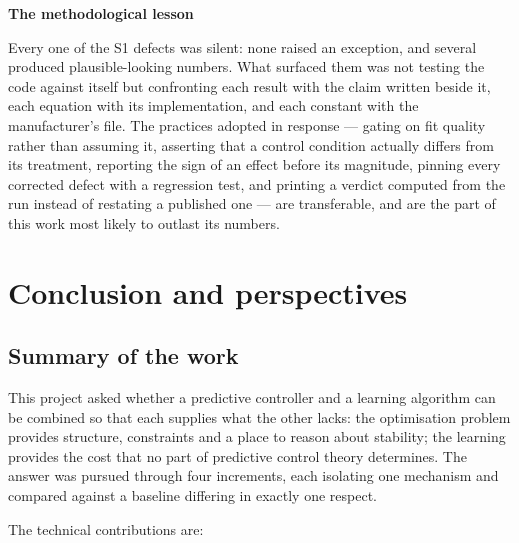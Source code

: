 \documentclass[11pt,a4paper,twoside,openright]{report}
\theoremstyle{plain}
\theoremstyle{definition}
\theoremstyle{remark}
\newcommand{\keyhead}[1]{\textbf{\sffamily\small\textcolor{NavyDeep}{#1}}\par\vspace{2pt}}
\begin{document}
	\begin{keybox}
		\keyhead{The methodological lesson}
		Every one of the S1 defects was silent: none raised an exception, and several
		produced plausible-looking numbers. What surfaced them was not testing the code
		against itself but confronting each result with the claim written beside it,
		each equation with its implementation, and each constant with the
		manufacturer's file. The practices adopted in response --- gating on fit
		quality rather than assuming it, asserting that a control condition actually
		differs from its treatment, reporting the sign of an effect before its
		magnitude, pinning every corrected defect with a regression test, and printing
		a verdict computed from the run instead of restating a published one --- are
		transferable, and are the part of this work most likely to outlast its numbers.
	\end{keybox}
	\chapter{Conclusion and perspectives}
	\label{ch:conclusion}

	\section{Summary of the work}

	This project asked whether a predictive controller and a learning algorithm can
	be combined so that each supplies what the other lacks: the optimisation problem
	provides structure, constraints and a place to reason about stability; the
	learning provides the cost that no part of predictive control theory determines.
	The answer was pursued through four increments, each isolating one mechanism and
	compared against a baseline differing in exactly one respect.

	The technical contributions are:
\end{document}
